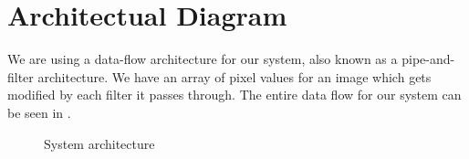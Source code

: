 \chapter{Architectual Diagram}

We are using a data-flow architecture for our system, also known as a pipe-and-filter architecture. 
We have an array of pixel values for an image which gets modified by each filter it passes through.
The entire data flow for our system can be seen in .
\newline

\begin{figure}[!h]
\noindent\resizebox{\textwidth}{!}{
  
}
\caption{System architecture}
\label{fig:architecture}
\end{figure}
